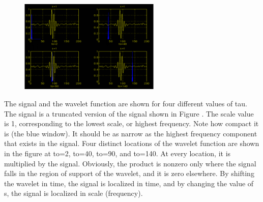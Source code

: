 \documentclass[12pt, a4paper, twoside]{report}
\begin{document}
\begin{figure}[!h]
	\centering
	\includegraphics[width=0.6\textwidth]
	{images/chapter3/cwt-1}
	\caption{}
	\label{fig:cwt-1}
\end{figure}

The signal and the wavelet function are shown for four different values of tau. The signal is a truncated version of the signal shown in Figure . The scale value is 1, corresponding to the lowest scale, or highest frequency. Note how compact it is (the blue window). It should be as narrow as the highest frequency component that exists in the signal. Four distinct locations of the wavelet function are shown in the figure at to=2, to=40, to=90, and to=140. At every location, it is multiplied by the signal. Obviously, the product is nonzero only where the signal falls in the region of support of the wavelet, and it is zero elsewhere. By shifting the wavelet in time, the signal is localized in time, and by changing the value of s, the signal is localized in scale (frequency).
\end{document}
